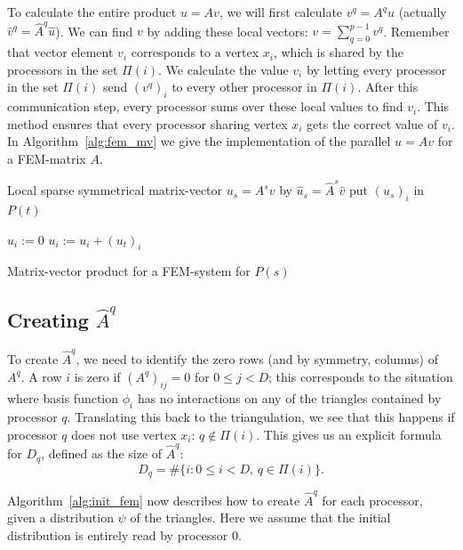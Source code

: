 \documentclass[11pt]{amsart}
\theoremstyle{definition}
\begin{document}
To calculate the entire product $u = Av$, we will first calculate $v^q = A^q u$ (actually $\hat v^q = \hat A^q \hat u$). We can find $v$ by adding these local vectors: $v = \sum_{q =0}^{p-1} v^q$. Remember that vector element $v_i$ corresponds to a vertex $x_i$, which is shared by the processors in the set $\Pi(i)$. We calculate the value $v_i$ by letting every processor in the set $\Pi(i)$ send $(v^q)_i$ to every other processor in $\Pi(i)$. After this communication step, every processor sums over these local values to find $v_i$. This method ensures that every processor sharing vertex $x_i$ gets the correct value of $v_i$. In Algorithm~\ref{alg:fem_mv} we give the implementation of the parallel $u = Av$ for a FEM-matrix $A$.

\begin{algorithm}[H]
	Local sparse symmetrical matrix-vector $u_s = A^s v$ by $\hat u_s = \hat A^s \hat v$\;
	 {
		 {
			put $(u_s)_i$ in $P(t)$\;
		}
	}
  
	 {
		$u_i := 0$\;
		 {
			$u_i := u_i + (u_t)_i$\;
		}
	}
 \caption{Matrix-vector product for a FEM-system for $P(s)$}
 \label{alg:fem_mv}
\end{algorithm}

\subsection{Creating $\hat A^q$}
To create $\hat A^q$, we need to identify the zero rows (and by symmetry, columns) of $A^q$. A row $i$ is zero if $(A^q)_{ij} = 0$ for $0 \leq j < D$; this corresponds to the situation where basis function $\phi_i$ has no interactions on any of the triangles contained by processor $q$.  Translating this back to the triangulation, we see that this happens if processor $q$ does not use vertex $x_i$: $q \not \in \Pi(i)$. This gives us an explicit formula for $D_q$, defined as the size of $\hat A^q$:
\[
	D_q = \#\{ i : 0 \leq i < D,\, q \in \Pi(i)\}.
\]

Algorithm~\ref{alg:init_fem} now describes how to create $\hat A^q$ for each processor, given a distribution $\psi$ of the triangles. Here  we assume that the initial distribution is entirely read by processor $0$.
\end{document}
